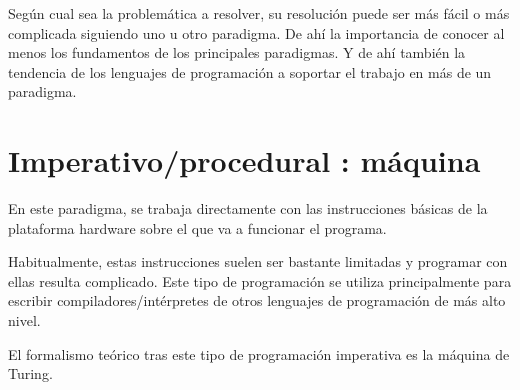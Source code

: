 \documentclass[spanish,12pt,a4paper,final,oneside]{book}
\begin{document}
Según cual sea la problemática a resolver, su resolución puede ser más fácil o más complicada siguiendo uno u otro paradigma. De ahí la importancia de conocer al menos los fundamentos de los principales paradigmas. Y de ahí también la tendencia de los lenguajes de programación a soportar el trabajo en más de un paradigma.

\section{Imperativo/procedural : máquina}
En este paradigma, se trabaja directamente con las instrucciones básicas de la plataforma hardware sobre el que va a funcionar el programa.

Habitualmente, estas instrucciones suelen ser bastante limitadas y programar con ellas resulta complicado. Este tipo de programación se utiliza principalmente para escribir compiladores/intérpretes de otros lenguajes de programación de más alto nivel.

El formalismo teórico tras este tipo de programación imperativa es la máquina de Turing.
\end{document}
